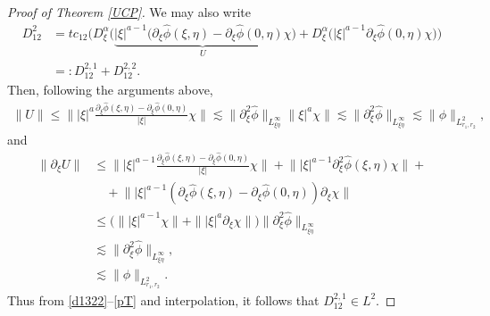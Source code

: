 \documentclass[reqno]{amsart}
\newcommand{\pphi}{\|\partial_\xi^2 \hat{\phi}\|_{L^\infty_{\xi \eta}}}
\newcommand{\ha}{\hat{\phi}}
\newcommand{\les}{\lesssim}
\newcommand{\La}{\|\phi\|_{L^2_{r_1,r_2}}}
\newcommand{\dt}{D^{\alpha}_\xi}
\newcommand{\p}{\partial}
\numberwithin{equation}{section}
\begin{document}
\begin{proof}[Proof of Theorem \ref{UCP}]
We may also write
\begin{equation}
\begin{split}\label{d1322}
D_{12}^2&=tc_{12}\Big(\dt \big(\underbrace{|\xi|^{a-1}(\p_\xi \ha(\xi,\eta)-\p_\xi \ha(0,\eta)\chi}_{U} \big)+ \dt \big( |\xi|^{a-1}\p_\xi \ha(0,\eta)\chi\big)\Big)\\
&=:D_{12}^{2,1}+D_{12}^{2,2}.
\end{split}
\end{equation}
Then, following the arguments above,
\begin{equation}
\begin{split}\label{T}
\|U\|\leq \Big\| |\xi|^{a}\frac{\p_\xi \ha(\xi,\eta)-\p_\xi \ha(0,\eta)}{|\xi|}\chi\Big\|
                            \lesssim  \pphi \|\xi|^{a}\chi\|
                            \lesssim \pphi
                           \les\La,
\end{split}
\end{equation}
and
\begin{equation}
\begin{split}\label{pT}
\|\partial_\xi U\|&\leq \Big\||\xi|^{a-1} \frac{\p_\xi \ha(\xi,\eta)-\p_\xi \ha(0,\eta)}{|\xi|}\chi \Big\|+
                     \Big\||\xi|^{a-1}\partial_\xi^2 \hat{\phi}(\xi,\eta) \chi \Big\|+ \\
                    &\quad+\Big\||\xi|^{a-1}(\p_\xi \ha(\xi,\eta)-\p_\xi \ha(0,\eta)) \p_\xi\chi  \Big\|\\
                            &\leq \Big(\||\xi|^{a-1}\chi \|+\||\xi|^{a}\p_\xi\chi\|\Big)\|\partial_\xi^2 \hat{\phi}\|_{L^{\infty}_{\xi\eta}}\\
                            &\lesssim  \|\partial_\xi^2 \hat{\phi}\|_{L^{\infty}_{\xi\eta}},\\
                            &\lesssim \La.
\end{split}
\end{equation}
 Thus from \eqref{d1322}--\eqref{pT} and interpolation, it follows that $D_{12}^{2,1} \in L^2$.


\end{proof}
\end{document}
